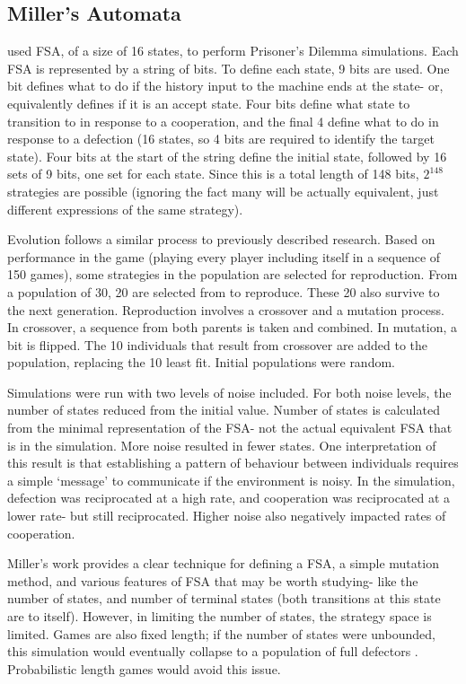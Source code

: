 \documentclass[a4paper,11pt]{article}
\begin{document}
\subsection{Miller's Automata}
\citet{miller1996coevolution} used FSA, of a size of 16 states, to perform Prisoner's Dilemma simulations.  
Each FSA is represented by a string of bits. 
To define each state, 9 bits are used. One bit defines what to do if the history input to the machine ends at the state- or, equivalently defines if it is an accept state. Four bits define what state to transition to in response to a cooperation, and the final 4 define what to do in response to a defection (16 states, so 4 bits are required to identify the target state). 
Four bits at the start of the string define the initial state, followed by 16 sets of 9 bits, one set for each state. 
Since this is a total length of 148 bits, $2^{148}$ strategies are possible (ignoring the fact many will be actually equivalent, just different expressions of the same strategy). 

Evolution follows a similar process to previously described research. 
Based on performance in the game (playing every player including itself in a sequence of 150 games), some strategies in the population are selected for reproduction. 
From a population of 30, 20 are selected from to reproduce. 
These 20 also survive to the next generation. 
Reproduction involves a crossover and a mutation process. 
In crossover, a sequence from both parents is taken and combined. 
In mutation, a bit is flipped. 
The 10 individuals that result from crossover are added to the population, replacing the 10 least fit. 
Initial populations were random. 

Simulations were run with two levels of noise included.  
For both noise levels, the number of states reduced from the initial value. 
Number of states is calculated from the minimal representation of the FSA- not the actual equivalent FSA that is in the simulation. 
More noise resulted in fewer states. 
One interpretation of this result is that establishing a pattern of behaviour between individuals requires a simple `message' to communicate if the environment is noisy. 
In the simulation, defection was reciprocated at a high rate, and cooperation was reciprocated at a lower rate- but still reciprocated. 
Higher noise also negatively impacted rates of cooperation. 

Miller's work provides a clear technique for defining a FSA, a simple mutation method, and various features of FSA that may be worth studying- like the number of states, and number of terminal states (both transitions at this state are to itself). However, in limiting the number of states, the strategy space is limited. Games are also fixed length; if the number of states were unbounded, this simulation would eventually collapse to a population of full defectors \citep{aumann1995backward}. Probabilistic length games would avoid this issue.
\end{document}
